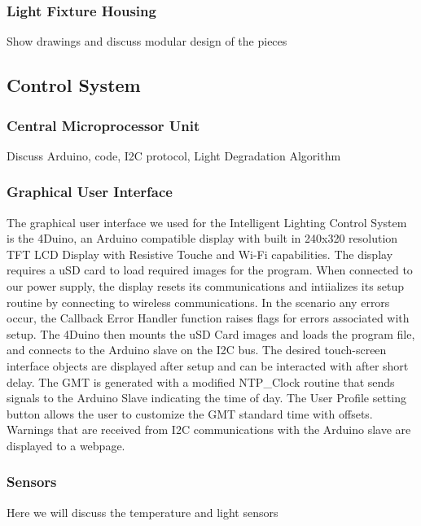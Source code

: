 \documentclass[12pt,a4paper]{report}
\begin{document}
\subsubsection{Light Fixture Housing}
Show drawings and discuss modular design of the pieces

\subsection{Control System}
\blindtext
\subsubsection{Central Microprocessor Unit}
Discuss Arduino, code, I2C protocol, Light Degradation Algorithm

\subsubsection{Graphical User Interface}
The graphical user interface we used for the Intelligent Lighting Control System is the 4Duino, an Arduino compatible display with built in 240x320 resolution TFT LCD Display with Resistive Touche and Wi-Fi capabilities. The display requires a uSD card to load required images for the program. When connected to our power supply, the display resets its communications and intiializes its setup routine by connecting to wireless communications. In the scenario any errors occur, the Callback Error Handler function raises flags for errors associated with setup. The 4Duino then mounts the uSD Card images and loads the program file, and connects to the Arduino slave on the I2C bus. The desired touch-screen interface objects are displayed after setup and can be interacted with after short delay. The GMT is generated with a modified NTP_Clock routine that sends signals to the Arduino Slave indicating the time of day. The User Profile setting button allows the user to customize the GMT standard time with offsets. Warnings that are received from I2C communications with the Arduino slave are displayed to a webpage.

\subsubsection{Sensors}
Here we will discuss the temperature and light sensors
\end{document}
